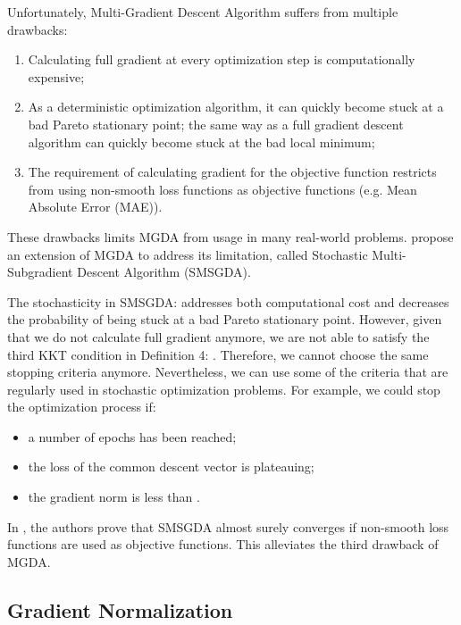 \documentclass[letterpaper]{article}
\begin{document}
Unfortunately, Multi-Gradient Descent Algorithm suffers from multiple drawbacks:
\begin{enumerate}
    \item Calculating full gradient at every optimization step is computationally expensive;
    \item As a deterministic optimization algorithm, it can quickly become stuck at a bad Pareto stationary point; the same way as a full gradient descent algorithm can quickly become stuck at the bad local minimum;
    \item The requirement of calculating gradient for the objective function restricts from using non-smooth loss functions as objective functions (e.g. Mean Absolute Error (MAE)).
\end{enumerate}

These drawbacks limits MGDA from usage in many real-world problems. \cite{poirion:hal-01660788} propose an extension of MGDA to address its limitation, called Stochastic Multi-Subgradient Descent Algorithm (SMSGDA).

The stochasticity in SMSGDA: addresses both computational cost and decreases the probability of being stuck at a bad Pareto stationary point. However, given that we do not calculate full gradient anymore, we are not able to satisfy the third KKT condition in Definition 4: . Therefore, we cannot choose the same stopping criteria anymore. Nevertheless, we can use some of the criteria that are regularly used in stochastic optimization problems. For example, we could stop the optimization process if:
\begin{itemize}
    \item a number of epochs has been reached;
    \item the loss of the common descent vector  is plateauing;
    \item the gradient norm is less than .
\end{itemize}

In \cite{poirion:hal-01660788}, the authors prove that SMSGDA almost surely converges if non-smooth loss functions are used as objective functions. This alleviates the third drawback of MGDA.

\subsection{Gradient Normalization}
\paragraph{}
\end{document}
